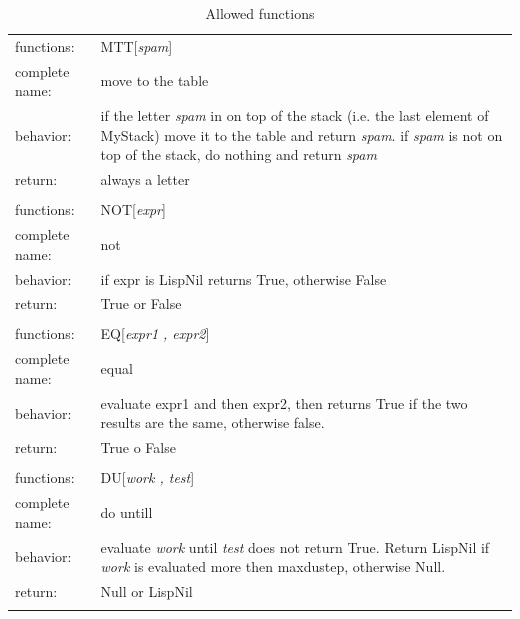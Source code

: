 \documentclass[12pt, a4paper]{article}
\begin{document}
\begin{longtable}{|l|p{10.0cm}|}
\hline
functions:		& 	MTT[{\itshape spam}]\\
complete name:	& 	move to the table\\
behavior:	& 	if the letter {\itshape spam} in on top of the stack (i.e. the last element of MyStack) move it to the table and return {\itshape spam}. if {\itshape spam} is not on top of the stack, do nothing and return {\itshape spam} \\
return:			& 	always a letter\\
\hline
\multicolumn{2}{|c|}{}\\

\hline
functions:		& 	NOT[{\itshape expr}]\\
complete name:	& 	not\\
behavior:	& 	if expr is LispNil returns True, otherwise False\\
return:			& 	True or False\\
\hline
\multicolumn{2}{|c|}{}\\

\hline
functions:		& 	EQ[{\itshape expr1 , expr2}]\\
complete name:	& 	equal\\
behavior:	& 	evaluate expr1 and then expr2, then returns True if the two results are the same, otherwise false.\\
return:			& 	True o False\\
\hline
\multicolumn{2}{|c|}{}\\

\hline
functions:		& 	DU[{\itshape work , test}]\\
complete name:	& 	do untill\\
behavior:	& 	evaluate \textit{work} until \textit{test} does not return True. Return LispNil if \textit{work} is evaluated more then maxdustep, otherwise Null.\\
return:			& 	Null or LispNil\\
\hline
\caption{Allowed functions}
\label{table:basicfun}
\end{longtable}

\lstset{caption=main functions implementation,
		label=source:basfun}

\end{document}
